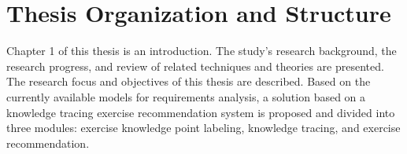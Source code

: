 \section{Thesis Organization and Structure}


Chapter 1 of this thesis is an introduction. The study's research background, the research progress, and review of related techniques and theories are presented. The research focus and objectives of this thesis are described. Based on the currently available models for requirements analysis, a solution based on a knowledge tracing exercise recommendation system is proposed and divided into three modules: exercise knowledge point labeling, knowledge tracing, and exercise recommendation.

